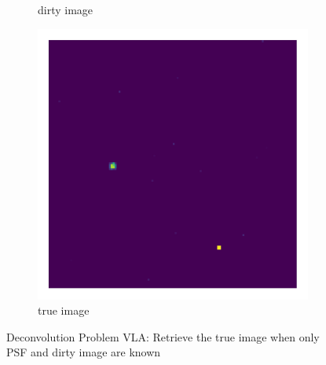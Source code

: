 \begin{figure}[h!]
\begin{subfigure}[b]{0.28\linewidth}
		\caption{dirty image}
	\end{subfigure}
	\begin{subfigure}[b]{0.28\linewidth}
		\includegraphics[width=\linewidth, trim={18px 19px 18px 18px}, clip]{./chapters/01.intro/img/true_image.png}
		\caption{true image}
	\end{subfigure}
	\caption{Deconvolution Problem VLA: Retrieve the true image when only PSF and dirty image are known}
	\label{intro:measurement_problem}
\end{figure}




